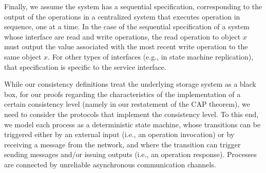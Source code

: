 \documentclass[journal,compsoc]{IEEEtran}
\begin{document}
Finally, we assume the system has a sequential specification, %
 corresponding to the output of the operations in a centralized system that executes operation in sequence, one at a time. In the case of the sequential specification of a system whose interface are read and write operations, the read operation to object $x$ must output the value associated with the most recent write operation to the same object $x$. For other types of interfaces (e.g., in state machine replication), that specification %
 is specific to the service interface. %

 
While our consistency definitions treat the underlying storage system as a black box, for our proofs regarding the characteristics of the implementation of a certain consistency level (namely in our restatement of the CAP theorem), we need to consider the protocols that implement the consistency level. To this end, we model each process as a deterministic state machine, whose transitions can be triggered either by an external input (i.e., an operation invocation) or by receiving a message from the network, and where the transition can trigger sending messages and/or issuing outputs (i.e., an operation response). Processes are connected by unreliable asynchronous communication channels.
\end{document}

